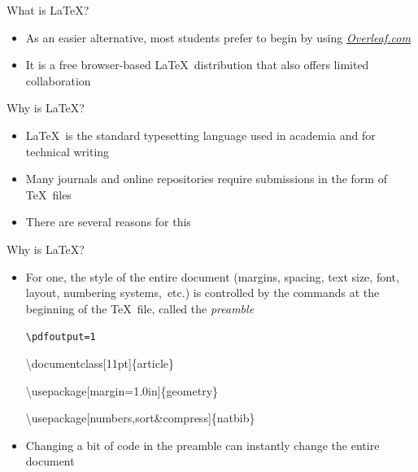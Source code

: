 \documentclass{beamer} %
\begin{document}
\begin{frame}{What is \LaTeX?}

\begin{itemize}
	\item As an easier alternative, most students prefer to begin by using \href{https://www.overleaf.com/}{\textit{Overleaf.com}}
	\item It is a free browser-based \LaTeX\ distribution that also offers limited collaboration
\end{itemize}

\end{frame}

\begin{frame}{Why is \LaTeX?}

\begin{itemize}
	\item \LaTeX\ is the standard typesetting language used in academia and for technical writing
	\item Many journals and online repositories require submissions in the form of \TeX\ files
	\item There are several reasons for this
\end{itemize}

\end{frame}

\begin{frame}{Why is \LaTeX?}

\begin{itemize}
	\item For one, the style of the entire document (margins, spacing, text size, font, layout, numbering systems,~etc.) is controlled by the commands at the beginning of the \TeX\ file, called the \textit{preamble}
	
	\quad
	
	{\tt \textbackslash pdfoutput=1
	
	\textbackslash documentclass[11pt]\{article\}
	
	\textbackslash usepackage[margin=1.0in]\{geometry\}
	
	\textbackslash usepackage[numbers,sort\&compress]\{natbib\}}
	
	\quad
	
	\item Changing a bit of code in the preamble can instantly change the entire document
\end{itemize}

\end{frame}
\end{document}
